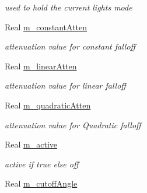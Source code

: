 \begin{DoxyCompactItemize}
\begin{DoxyCompactList}\small\item\em used to hold the current lights mode \end{DoxyCompactList}\item 
\hypertarget{classngl_1_1_light_ae599f2dfec737b23af75cbcb6be6613e}{Real \hyperlink{classngl_1_1_light_ae599f2dfec737b23af75cbcb6be6613e}{m\-\_\-constant\-Atten}}\label{classngl_1_1_light_ae599f2dfec737b23af75cbcb6be6613e}

\begin{DoxyCompactList}\small\item\em attenuation value for constant falloff \end{DoxyCompactList}\item 
\hypertarget{classngl_1_1_light_aebe8996368d8c7598cffba36883084e0}{Real \hyperlink{classngl_1_1_light_aebe8996368d8c7598cffba36883084e0}{m\-\_\-linear\-Atten}}\label{classngl_1_1_light_aebe8996368d8c7598cffba36883084e0}

\begin{DoxyCompactList}\small\item\em attenuation value for linear falloff \end{DoxyCompactList}\item 
\hypertarget{classngl_1_1_light_a926e5c7567ad0b2e09548dd6a8e60d7c}{Real \hyperlink{classngl_1_1_light_a926e5c7567ad0b2e09548dd6a8e60d7c}{m\-\_\-quadratic\-Atten}}\label{classngl_1_1_light_a926e5c7567ad0b2e09548dd6a8e60d7c}

\begin{DoxyCompactList}\small\item\em attenuation value for Quadratic falloff \end{DoxyCompactList}\item 
\hypertarget{classngl_1_1_light_a1cdd46b20e1d7f6e8d4aa01a4b3f72ad}{Real \hyperlink{classngl_1_1_light_a1cdd46b20e1d7f6e8d4aa01a4b3f72ad}{m\-\_\-active}}\label{classngl_1_1_light_a1cdd46b20e1d7f6e8d4aa01a4b3f72ad}

\begin{DoxyCompactList}\small\item\em active if true else off \end{DoxyCompactList}\item 
\hypertarget{classngl_1_1_light_a61ea1115270a6b4798a6383a8c2c1b26}{Real \hyperlink{classngl_1_1_light_a61ea1115270a6b4798a6383a8c2c1b26}{m\-\_\-cutoff\-Angle}}\label{classngl_1_1_light_a61ea1115270a6b4798a6383a8c2c1b26}


\end{DoxyCompactItemize}
